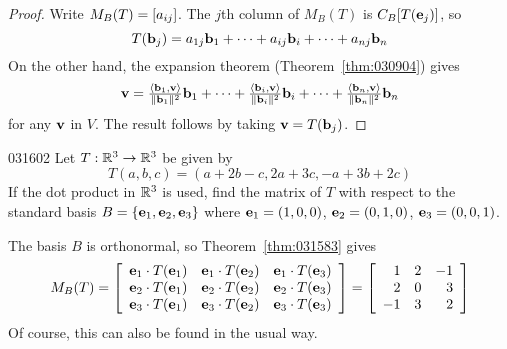\begin{proof}
Write $M_{B}(T) = \left[ a_{ij} \right]$. The $j$th column of $M_{B}(T)$ is $C_{B}[T(\textbf{e}_{j})]$, so
\begin{equation*}
T(\textbf{b}_j) = a_{1j}\textbf{b}_1 + \dots + a_{ij}\textbf{b}_i + \dots + a_{nj}\textbf{b}_n
\end{equation*}
On the other hand, the expansion theorem (Theorem~\ref{thm:030904}) gives
\begin{equation*}
\textbf{v} = \tfrac{\langle \textbf{b}_1, \textbf{v} \rangle}{\| \textbf{b}_1 \| ^2} \textbf{b}_1 + \dots + 
\tfrac{\langle \textbf{b}_i, \textbf{v} \rangle}{\| \textbf{b}_i \| ^2} \textbf{b}_i + \dots +
\tfrac{\langle \textbf{b}_n, \textbf{v} \rangle}{\| \textbf{b}_n \| ^2} \textbf{b}_n
\end{equation*}
for any $\textbf{v}$ in $V$. The result follows by taking $\textbf{v} = T(\textbf{b}_{j})$.
\end{proof}

\begin{example}{}{031602}
Let $T : \mathbb{R}^3 \to \mathbb{R}^3$ be given by
\begin{equation*}
T(a, b, c) = (a + 2b - c, 2a + 3c, -a + 3b + 2c)
\end{equation*}
If the dot product in $\mathbb{R}^3$ is used, find the matrix of $T$ with respect to the standard basis $B = \{\textbf{e}_{1}, \textbf{e}_{2}, \textbf{e}_{3}\}$ where $\textbf{e}_{1} = (1, 0, 0)$, $\textbf{e}_{2} = (0, 1, 0)$, $\textbf{e}_{3} = (0, 0, 1)$.

\begin{solution}
The basis $B$ is orthonormal, so Theorem~\ref{thm:031583} gives
\begin{equation*}
M_B(T) = 
\left[ \begin{array}{rrr}
\textbf{e}_1 \cdot T(\textbf{e}_1) & \textbf{e}_1 \cdot T(\textbf{e}_2) & \textbf{e}_1 \cdot T(\textbf{e}_3) \\
\textbf{e}_2 \cdot T(\textbf{e}_1) & \textbf{e}_2 \cdot T(\textbf{e}_2) & \textbf{e}_2 \cdot T(\textbf{e}_3) \\
\textbf{e}_3 \cdot T(\textbf{e}_1) & \textbf{e}_3 \cdot T(\textbf{e}_2) & \textbf{e}_3 \cdot T(\textbf{e}_3) 
\end{array} \right]
=
\left[ \begin{array}{rrr}
 1 & 2 & -1 \\
 2 & 0 &  3 \\
-1 & 3 &  2
\end{array} \right]
\end{equation*}
Of course, this can also be found in the usual way.
\end{solution}
\end{example}

